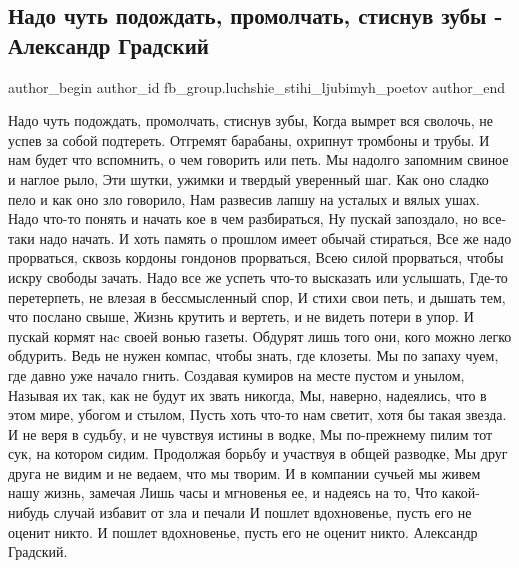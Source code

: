  
 
 
 
 
 
\subsection{Надо чуть подождать, промолчать, стиснув зубы - Александр Градский}
\label{sec:30_11_2021.fb.fb_group.luchshie_stihi_ljubimyh_poetov.1.gradskij_nado_podozhdat}
 
\ifcmt
 author_begin
   author_id fb_group.luchshie_stihi_ljubimyh_poetov
 author_end
\fi

\begin{multicols}{2}
\obeycr
Надо чуть подождать, промолчать, стиснув зубы,
Когда вымрет вся сволочь, не успев за собой подтереть.
Отгремят барабаны, охрипнут тромбоны и трубы.
И нам будет что вспомнить, о чем говорить или петь.
\smallskip
Мы надолго запомним свиное и наглое рыло,
Эти шутки, ужимки и твердый уверенный шаг.
Как оно сладко пело и как оно зло говорило,
Нам развесив лапшу на усталых и вялых ушах.
\smallskip
Надо что-то понять и начать кое в чем разбираться,
Ну пускай запоздало, но все-таки надо начать.
И хоть память о прошлом имеет обычай стираться,
Все же надо прорваться, сквозь кордоны гондонов прорваться,
Всею силой прорваться, чтобы искру свободы зачать.
\smallskip
Надо все же успеть что-то высказать или услышать,
Где-то перетерпеть, не влезая в бессмысленный спор,
И стихи свои петь, и дышать тем, что послано свыше,
Жизнь крутить и вертеть, и не видеть потери в упор.
И пускай кормят наc своей вонью газеты.
\smallskip
Обдурят лишь того они, кого можно легко обдурить.
Ведь не нужен компас, чтобы знать, где клозеты.
Мы по запаху чуем, где давно уже начало гнить.
\smallskip
Создавая кумиров на месте пустом и унылом,
Называя их так, как не будут их звать никогда,
Мы, наверно, надеялись, что в этом мире, убогом и стылом,
Пусть хоть что-то нам светит, хотя бы такая звезда.
\smallskip
И не веря в судьбу, и не чувствуя истины в водке,
Мы по-прежнему пилим тот сук, на котором сидим.
Продолжая борьбу и участвуя в общей разводке,
Мы друг друга не видим и не ведаем, что мы творим.
\smallskip
И в компании сучьей мы живем нашу жизнь, замечая
Лишь часы и мгновенья ее, и надеясь на то,
Что какой-нибудь случай избавит от зла и печали
И пошлет вдохновенье, пусть его не оценит никто.
И пошлет вдохновенье, пусть его не оценит никто.
\smallskip
Александр Градский.
\restorecr
\end{multicols}
